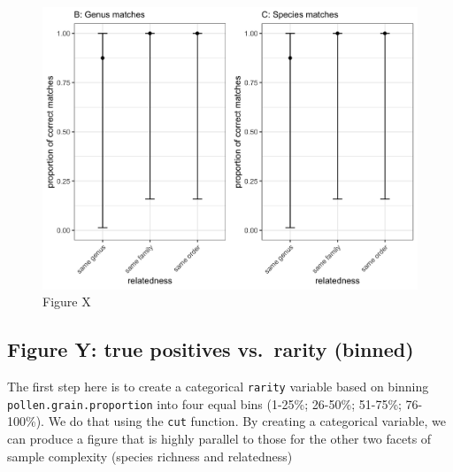 \documentclass[
]{article}
\begin{document}
\begin{figure}
\centering
\includegraphics{figX_combined.jpg}
\caption{Figure X}
\end{figure}

\hypertarget{figure-y-true-positives-vs.-rarity-binned}{%
\subsection{Figure Y: true positives vs.~rarity
(binned)}\label{figure-y-true-positives-vs.-rarity-binned}}

The first step here is to create a categorical \texttt{rarity} variable
based on binning \texttt{pollen.grain.proportion} into four equal bins
(1-25\%; 26-50\%; 51-75\%; 76-100\%). We do that using the \texttt{cut}
function. By creating a categorical variable, we can produce a figure
that is highly parallel to those for the other two facets of sample
complexity (species richness and relatedness)
\end{document}
